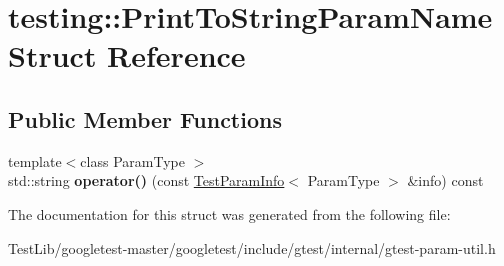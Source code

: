 \hypertarget{structtesting_1_1PrintToStringParamName}{}\section{testing\+:\+:Print\+To\+String\+Param\+Name Struct Reference}
\label{structtesting_1_1PrintToStringParamName}
\subsection*{Public Member Functions}
\begin{DoxyCompactItemize}
\item 
\mbox{\label{structtesting_1_1PrintToStringParamName_a05b411cfb75dadb2c3c0355aee1dcf21}} 
{\footnotesize template$<$class Param\+Type $>$ }\\std\+::string {\bfseries operator()} (const \hyperlink{structtesting_1_1TestParamInfo}{Test\+Param\+Info}$<$ Param\+Type $>$ \&info) const
\end{DoxyCompactItemize}


The documentation for this struct was generated from the following file\+:\begin{DoxyCompactItemize}
\item 
Test\+Lib/googletest-\/master/googletest/include/gtest/internal/gtest-\/param-\/util.\+h\end{DoxyCompactItemize}
